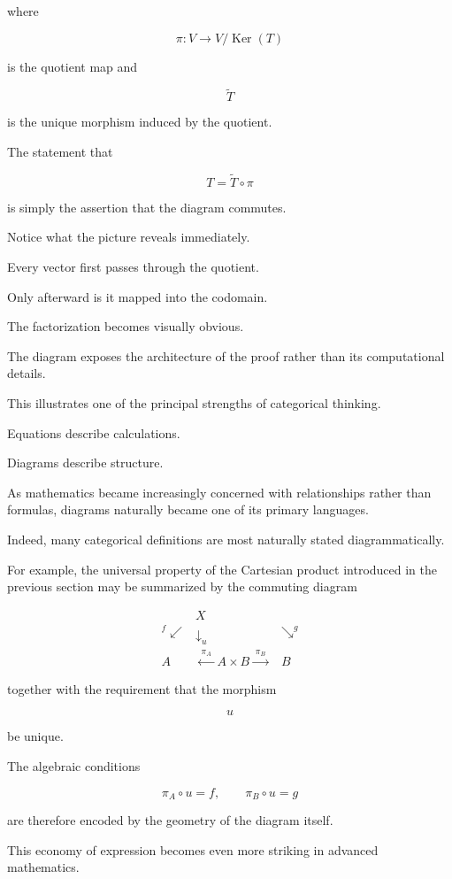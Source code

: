 \documentclass[11pt]{book}
\numberwithin{equation}{chapter}
\theoremstyle{definition}
\theoremstyle{plain}
\theoremstyle{remark}
\DeclareMathOperator{\Ker}{Ker}
\begin{document}
where

\[
\pi:V\rightarrow V/\Ker(T)
\]

is the quotient map and

\[
\widetilde{T}
\]

is the unique morphism induced by the quotient.

The statement that

\[
T=\widetilde{T}\circ\pi
\]

is simply the assertion that the diagram commutes.

Notice what the picture reveals immediately.

Every vector first passes through the quotient.

Only afterward is it mapped into the codomain.

The factorization becomes visually obvious.

The diagram exposes the architecture of the proof rather than its computational details.

This illustrates one of the principal strengths of categorical thinking.

Equations describe calculations.

Diagrams describe structure.

As mathematics became increasingly concerned with relationships rather than formulas, diagrams naturally became one of its primary languages.

Indeed, many categorical definitions are most naturally stated diagrammatically.

For example, the universal property of the Cartesian product introduced in the previous section may be summarized by the commuting diagram

\[
\begin{array}{ccc}
&
X
&
\\
{}^{f}\swarrow
&
\downarrow_{u}
&
\searrow^{g}
\\
A
&
\xleftarrow{\;\pi_A\;}
A\times B
\xrightarrow{\;\pi_B\;}
&
B
\end{array}
\]

together with the requirement that the morphism

\[
u
\]

be unique.

The algebraic conditions

\[
\pi_A\circ u=f,
\qquad
\pi_B\circ u=g
\]

are therefore encoded by the geometry of the diagram itself.

This economy of expression becomes even more striking in advanced mathematics.
\end{document}
